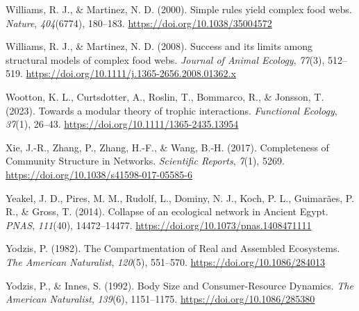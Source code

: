 \documentclass[
]{article}
\newlength{\cslhangindent}
\newenvironment{CSLReferences}[2] %
 {\begin{list}{}{%
  \setlength{\itemindent}{0pt}
  \setlength{\leftmargin}{0pt}
  \setlength{\parsep}{0pt}
  \ifodd #1
   \setlength{\leftmargin}{\cslhangindent}
   \setlength{\itemindent}{-1\cslhangindent}
  \fi
  \setlength{\itemsep}{#2\baselineskip}}}
 {\end{list}}
\begin{document}
\begin{CSLReferences}{1}{0}
Williams, R. J., \& Martinez, N. D. (2000). Simple rules yield complex
food webs. \emph{Nature}, \emph{404}(6774), 180--183.
\url{https://doi.org/10.1038/35004572}

Williams, R. J., \& Martinez, N. D. (2008). Success and its limits among
structural models of complex food webs. \emph{Journal of Animal
Ecology}, \emph{77}(3), 512--519.
\url{https://doi.org/10.1111/j.1365-2656.2008.01362.x}

Wootton, K. L., Curtsdotter, A., Roslin, T., Bommarco, R., \& Jonsson,
T. (2023). Towards a modular theory of trophic interactions.
\emph{Functional Ecology}, \emph{37}(1), 26--43.
\url{https://doi.org/10.1111/1365-2435.13954}

Xie, J.-R., Zhang, P., Zhang, H.-F., \& Wang, B.-H. (2017). Completeness
of {Community Structure} in {Networks}. \emph{Scientific Reports},
\emph{7}(1), 5269. \url{https://doi.org/10.1038/s41598-017-05585-6}

Yeakel, J. D., Pires, M. M., Rudolf, L., Dominy, N. J., Koch, P. L.,
Guimarães, P. R., \& Gross, T. (2014). Collapse of an ecological network
in {Ancient Egypt}. \emph{PNAS}, \emph{111}(40), 14472--14477.
\url{https://doi.org/10.1073/pnas.1408471111}

Yodzis, P. (1982). The {Compartmentation} of {Real} and {Assembled
Ecosystems}. \emph{The American Naturalist}, \emph{120}(5), 551--570.
\url{https://doi.org/10.1086/284013}

Yodzis, P., \& Innes, S. (1992). Body {Size} and {Consumer-Resource
Dynamics}. \emph{The American Naturalist}, \emph{139}(6), 1151--1175.
\url{https://doi.org/10.1086/285380}

\end{CSLReferences}
\end{document}

